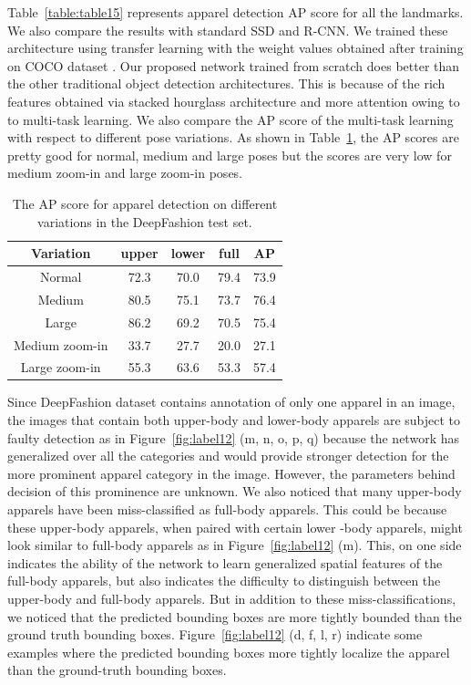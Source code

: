 \documentclass[conference]{IEEEtran}
\begin{document}
Table~\ref{table:table15} represents apparel detection AP score for all the landmarks. We also compare the results with standard SSD and R-CNN. We trained these architecture using transfer learning with the weight values obtained after training on COCO dataset \cite{lecun1999object}. Our proposed network trained from scratch does better than the other traditional object detection architectures. This is because of the rich features obtained via stacked hourglass architecture and more attention owing to to multi-task learning. We also compare the AP score of the multi-task learning with respect to different pose variations. As shown in Table~\ref{table:table16}, the AP scores are pretty good for normal, medium and large poses but the scores are very low for medium zoom-in and large zoom-in poses. 
\begin{table}[ht]
    \centering
    \scriptsize
    \caption{The AP score for apparel detection on different variations in the DeepFashion test set.}
    \begin{tabular}{|c|c|c|c|c|}
    \hline
    \textbf{Variation} & \textbf{upper} & \textbf{lower} & \textbf{full}  & \textbf{AP} \\[3pt]
    \hline
    Normal & 72.3 & 70.0 & 79.4 & 73.9   \\[2pt]
    \hline
    Medium & 80.5 & 75.1  & 73.7 & 76.4  \\[2pt]
    \hline
    Large  & 86.2 & 69.2 & 70.5 & 75.4 \\[2pt]
    \hline
    Medium zoom-in  & 33.7 & 27.7 & 20.0 &  27.1 \\[2pt]
    \hline
    Large zoom-in  & 55.3 & 63.6  & 53.3 & 57.4 \\[2pt]
    \hline
    \end{tabular}
    \label{table:table16}
\end{table}

Since  DeepFashion dataset contains annotation of only one apparel in an image, the images that contain both upper-body and lower-body apparels are subject to faulty detection as in Figure~\ref{fig:label12} (m, n, o, p, q) because the network has generalized over all the categories and would provide stronger detection for the more prominent apparel category in the image. However, the parameters behind decision of this prominence are unknown.  We also noticed that many upper-body apparels have been miss-classified as full-body apparels. This could be because these upper-body apparels, when paired with certain lower -body apparels, might look similar to full-body apparels as in Figure~\ref{fig:label12} (m). This, on one side indicates the ability of the network to learn generalized spatial features of the full-body apparels, but also indicates the difficulty to distinguish between the upper-body and full-body apparels. But in addition to these miss-classifications, we noticed that the predicted bounding boxes are more tightly bounded than the ground truth bounding boxes. Figure~\ref{fig:label12} (d, f, l, r) indicate some examples where the predicted bounding boxes more tightly localize the apparel than the ground-truth bounding boxes.
\end{document}
